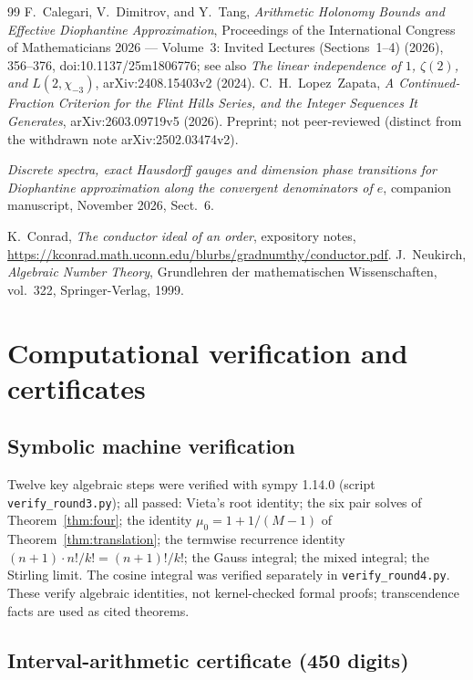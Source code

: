 \documentclass[11pt]{amsart}
\theoremstyle{definition}
\theoremstyle{remark}
\numberwithin{equation}{section}
\newcommand{\irr}{\mu}
\begin{document}
\begin{thebibliography}{99}
 F.~Calegari, V.~Dimitrov, and Y.~Tang, \emph{Arithmetic Holonomy Bounds and Effective Diophantine Approximation}, Proceedings of the International Congress of Mathematicians 2026 --- Volume~3: Invited Lectures (Sections~1--4) (2026), 356--376, doi:10.1137/25m1806776; see also \emph{The linear independence of $1$, $\zeta(2)$, and $L(2,\chi_{-3})$}, arXiv:2408.15403v2 (2024).
 C.~H.~Lopez~Zapata, \emph{A Continued-Fraction Criterion for the Flint Hills Series, and the Integer Sequences It Generates}, arXiv:2603.09719v5 (2026). Preprint; not peer-reviewed (distinct from the withdrawn note arXiv:2502.03474v2).

 \emph{Discrete spectra, exact Hausdorff gauges and dimension phase transitions for Diophantine approximation along the convergent denominators of $e$}, companion manuscript, November 2026, Sect.~6.

K.~Conrad, \emph{The conductor ideal of an order}, expository notes,
\url{https://kconrad.math.uconn.edu/blurbs/gradnumthy/conductor.pdf}.
J.~Neukirch, \emph{Algebraic Number Theory}, Grundlehren der
mathematischen Wissenschaften, vol.~322, Springer-Verlag, 1999.
\end{thebibliography}

\clearpage
\appendix

\section{Computational verification and certificates}\label{sec:computation}

\subsection{Symbolic machine verification}

Twelve key algebraic steps were verified with sympy 1.14.0 (script \texttt{verify\_round3.py}); all passed: Vieta's root identity; the six pair solves of Theorem~\ref{thm:four}; the identity $\irr_0=1+1/(M-1)$ of Theorem~\ref{thm:translation}; the termwise recurrence identity $(n+1)\cdot n!/k!=(n+1)!/k!$; the Gauss integral; the mixed integral; the Stirling limit. The cosine integral was verified separately in \texttt{verify\_round4.py}. These verify algebraic identities, not kernel-checked formal proofs; transcendence facts are used as cited theorems.

\subsection{Interval-arithmetic certificate (450 digits)}
\end{document}
